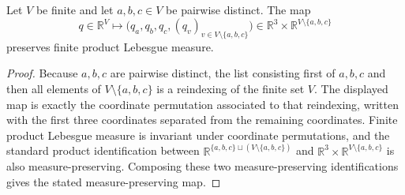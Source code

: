 \begin{helper}
Let \(V\) be finite and let \(a,b,c\in V\) be pairwise distinct.  The map
\[
q\in\mathbb R^V\longmapsto
\bigl(q_a,q_b,q_c,(q_v)_{v\in V\setminus\{a,b,c\}}\bigr)
\in \mathbb R^3\times\mathbb R^{V\setminus\{a,b,c\}}
\]
preserves finite product Lebesgue measure.
\end{helper}
\begin{proof}
Because \(a,b,c\) are pairwise distinct, the list consisting first of
\(a,b,c\) and then all elements of \(V\setminus\{a,b,c\}\) is a reindexing of
the finite set \(V\).  The displayed map is exactly the coordinate
permutation associated to that reindexing, written with the first three
coordinates separated from the remaining coordinates.  Finite product
Lebesgue measure is invariant under coordinate permutations, and the standard
product identification between
\(\mathbb R^{\{a,b,c\}\sqcup (V\setminus\{a,b,c\})}\) and
\(\mathbb R^3\times\mathbb R^{V\setminus\{a,b,c\}}\) is also
measure-preserving.  Composing these two measure-preserving identifications
gives the stated measure-preserving map.
\end{proof}
